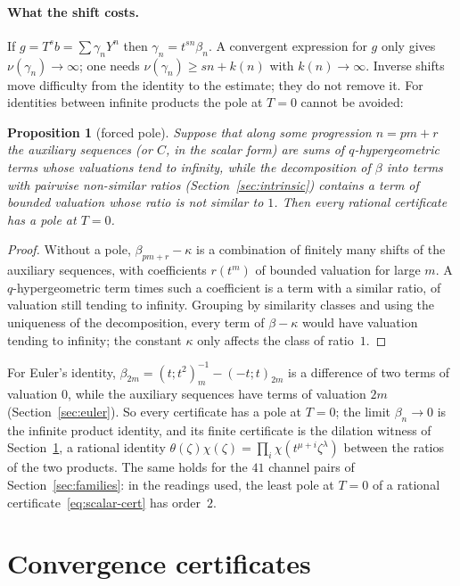 \documentclass[11pt,a4paper]{article}
\newcommand{\val}{\nu}
\theoremstyle{plain}
\newtheorem{proposition}[theorem]{Proposition}
\theoremstyle{definition}
\theoremstyle{remark}
\begin{document}
\paragraph{What the shift costs.} If $g=T^sb=\sum\gamma_nY^n$ then
$\gamma_n=t^{sn}\beta_n$. A convergent expression for $g$ only gives
$\val(\gamma_n)\to\infty$; one needs $\val(\gamma_n)\ge sn+k(n)$ with
$k(n)\to\infty$. Inverse shifts move difficulty from the identity to the
estimate; they do not remove it. For identities between infinite products the
pole at $T=0$ cannot be avoided:

\begin{proposition}[forced pole]\label{prop:forced-pole}
Suppose that along some progression $n=pm+r$ the auxiliary sequences (or $C$,
in the scalar form) are sums of $q$-hypergeometric terms whose valuations tend
to infinity, while the decomposition of $\beta$ into terms with pairwise
non-similar ratios (Section~\ref{sec:intrinsic}) contains a term of bounded
valuation whose ratio is not similar to $1$. Then every rational certificate
has a pole at $T=0$.
\end{proposition}
\begin{proof}
Without a pole, $\beta_{pm+r}-\kappa$ is a combination of finitely many shifts of
the auxiliary sequences, with coefficients $r(t^{m})$ of bounded valuation for
large $m$. A $q$-hypergeometric term times such a coefficient is a term with a
similar ratio, of valuation still tending to infinity. Grouping by similarity
classes and using the uniqueness of the decomposition, every term of $\beta-\kappa$
would have valuation tending to infinity; the constant $\kappa$ only affects the
class of ratio~$1$.
\end{proof}

For Euler's identity, $\beta_{2m}=(t;t^2)_m^{-1}-(-t;t)_{2m}$ is a difference of
two terms of valuation $0$, while the auxiliary sequences have terms of
valuation $2m$ (Section~\ref{sec:euler}). So every certificate has a pole at
$T=0$; the limit $\beta_n\to0$ is the infinite product identity, and its
finite certificate is the dilation witness of Section~\ref{sec:convergence}, a
rational identity $\theta(\zeta)\chi(\zeta)=\prod_i\chi(t^{\mu+i}\zeta^\lambda)$
between the ratios of the two products. The same holds for the $41$ channel
pairs of Section~\ref{sec:families}: in the readings used, the least pole at
$T=0$ of a rational certificate~\eqref{eq:scalar-cert} has order~$2$.

\section{Convergence certificates}\label{sec:convergence}
\end{document}
